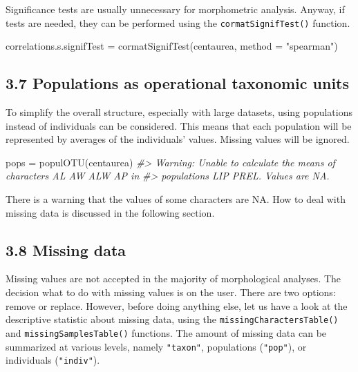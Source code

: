 \documentclass[
  11pt,
  a4paper]{article}
\newenvironment{Shaded}{\begin{snugshade}}{\end{snugshade}}
\newcommand{\AttributeTok}[1]{\textcolor[rgb]{0.77,0.63,0.00}{#1}}
\newcommand{\CommentTok}[1]{\textcolor[rgb]{0.56,0.35,0.01}{\textit{#1}}}
\newcommand{\FunctionTok}[1]{\textcolor[rgb]{0.00,0.00,0.00}{#1}}
\newcommand{\NormalTok}[1]{#1}
\newcommand{\OtherTok}[1]{\textcolor[rgb]{0.56,0.35,0.01}{#1}}
\newcommand{\StringTok}[1]{\textcolor[rgb]{0.31,0.60,0.02}{#1}}
\begin{document}
Significance tests are usually unnecessary for morphometric analysis.
Anyway, if tests are needed, they can be performed using the
\texttt{cormatSignifTest()} function.

\begin{Shaded}
\begin{Highlighting}[]
\NormalTok{correlations.s.signifTest }\OtherTok{=} \FunctionTok{cormatSignifTest}\NormalTok{(centaurea, }\AttributeTok{method =} \StringTok{"spearman"}\NormalTok{)}
\end{Highlighting}
\end{Shaded}

\hypertarget{populations-as-operational-taxonomic-units}{%
\subsection{3.7 Populations as operational taxonomic
units}\label{populations-as-operational-taxonomic-units}}

To simplify the overall structure, especially with large datasets, using
populations instead of individuals can be considered. This means that
each population will be represented by averages of the individuals'
values. Missing values will be ignored.

\begin{Shaded}
\begin{Highlighting}[]
\NormalTok{pops }\OtherTok{=} \FunctionTok{populOTU}\NormalTok{(centaurea)}
\CommentTok{\#\textgreater{} Warning: Unable to calculate the means of characters AL AW ALW AP in}
\CommentTok{\#\textgreater{} populations LIP PREL. Values are NA.}
\end{Highlighting}
\end{Shaded}

There is a warning that the values of some characters are NA. How to
deal with missing data is discussed in the following section.

\hypertarget{missing-data}{%
\subsection{3.8 Missing data}\label{missing-data}}

Missing values are not accepted in the majority of morphological
analyses. The decision what to do with missing values is on the user.
There are two options: remove or replace. However, before doing anything
else, let us have a look at the descriptive statistic about missing
data, using the \texttt{missingCharactersTable()} and
\texttt{missingSamplesTable()} functions. The amount of missing data can
be summarized at various levels, namely \texttt{"taxon"}, populations
(\texttt{"pop"}), or individuals (\texttt{"indiv"}).
\end{document}
